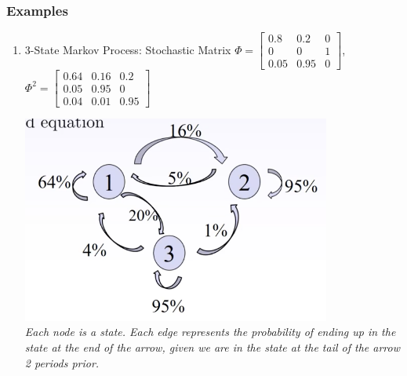 \documentclass{article}
\begin{document}
\subsubsection{Examples}
\begin{enumerate}
    \item 3-State Markov Process: Stochastic Matrix $ \Phi = \begin{bmatrix}
        0.8 & 0.2 & 0 \\
        0 & 0 & 1 \\
        0.05 & 0.95 & 0 
        \end{bmatrix} $, \\
        $ \Phi^2 = \begin{bmatrix}
            0.64 & 0.16 & 0.2 \\
            0.05 & 0.95 & 0 \\
            0.04 & 0.01 & 0.95 
            \end{bmatrix} $
    \begin{center}
        \includegraphics[width=0.8\textwidth]{imgs/stochastic_matrices2.png} \\
        \textit{Each node is a state. Each edge represents the probability of 
        ending up in the state at the end of the arrow, given we are in the 
        state at the tail of the arrow 2 periods prior.}
    \end{center}
\end{enumerate}
\end{document}
